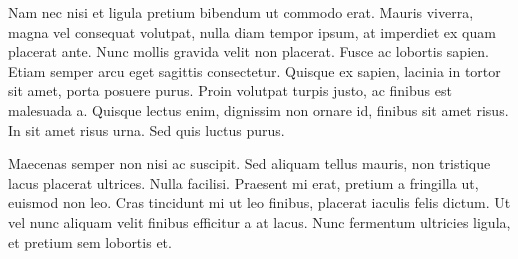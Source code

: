 \documentclass[11pt,]{article}
\begin{document}
Nam nec nisi et ligula pretium bibendum ut commodo erat. Mauris viverra,
magna vel consequat volutpat, nulla diam tempor ipsum, at imperdiet ex
quam placerat ante. Nunc mollis gravida velit non placerat. Fusce ac
lobortis sapien. Etiam semper arcu eget sagittis consectetur. Quisque ex
sapien, lacinia in tortor sit amet, porta posuere purus. Proin volutpat
turpis justo, ac finibus est malesuada a. Quisque lectus enim, dignissim
non ornare id, finibus sit amet risus. In sit amet risus urna. Sed quis
luctus purus.

Maecenas semper non nisi ac suscipit. Sed aliquam tellus mauris, non
tristique lacus placerat ultrices. Nulla facilisi. Praesent mi erat,
pretium a fringilla ut, euismod non leo. Cras tincidunt mi ut leo
finibus, placerat iaculis felis dictum. Ut vel nunc aliquam velit
finibus efficitur a at lacus. Nunc fermentum ultricies ligula, et
pretium sem lobortis et.
\end{document}
